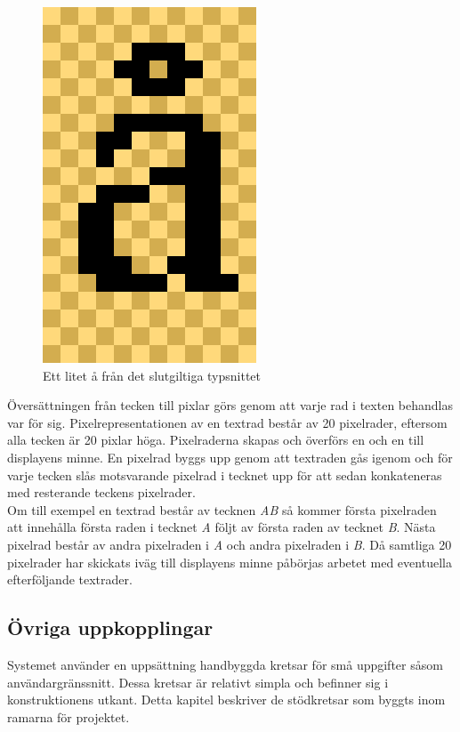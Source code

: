 \documentclass[a4paper,11pt]{article}
\begin{document}
\begin{figure}[H]
\begin{center}
\includegraphics[scale=0.5, angle=0]{fontAA.png}
\end{center}
\caption{Ett litet å från det slutgiltiga typsnittet}
\label{fig:fontAA}
\end{figure}

Översättningen från tecken till pixlar görs genom att varje rad i texten behandlas var för sig. Pixelrepresentationen av en textrad består av 20 pixelrader, eftersom alla tecken är 20 pixlar höga. Pixelraderna skapas och överförs en och en till displayens minne. En pixelrad byggs upp genom att textraden gås igenom och för varje tecken slås motsvarande pixelrad i tecknet upp för att sedan konkateneras med resterande teckens pixelrader.\\

 Om till exempel en textrad består av tecknen {\it AB} så kommer första pixelraden att innehålla första raden i tecknet {\it A} följt av första raden av tecknet {\it B}. Nästa pixelrad består av andra pixelraden i {\it A} och andra pixelraden i {\it B}. Då samtliga 20 pixelrader har skickats iväg till displayens minne påbörjas arbetet med eventuella efterföljande textrader.

\subsection{Övriga uppkopplingar}
Systemet använder en uppsättning handbyggda kretsar för små uppgifter såsom användargränssnitt. Dessa kretsar är relativt simpla och befinner sig i konstruktionens utkant. Detta kapitel beskriver de stödkretsar som byggts inom ramarna för projektet.
\end{document}
